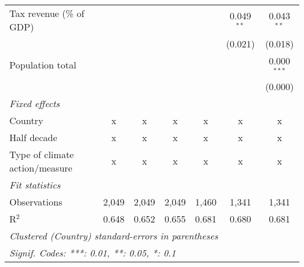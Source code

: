\begin{tabular}{lcccccc}
   Tax revenue (\% of GDP)                &         &                &                &                & 0.049$^{**}$   & 0.043$^{**}$\\   
                                          &         &                &                &                & (0.021)        & (0.018)\\   
   Population total                       &         &                &                &                &                & 0.000$^{***}$\\   
                                          &         &                &                &                &                & (0.000)\\   
   \emph{Fixed effects}\\
   Country                                & x       & x              & x              & x              & x              & x\\  
   Half decade                            & x       & x              & x              & x              & x              & x\\  
   Type of climate action/measure         & x       & x              & x              & x              & x              & x\\  
   \midrule \emph{Fit statistics}\\
   Observations                           & 2,049   & 2,049          & 2,049          & 1,460          & 1,341          & 1,341\\  
   R$^2$                                  & 0.648   & 0.652          & 0.655          & 0.681          & 0.680          & 0.681\\  
   \midrule
   \multicolumn{7}{l}{\emph{Clustered (Country) standard-errors in parentheses}}\\
   \multicolumn{7}{l}{\emph{Signif. Codes: ***: 0.01, **: 0.05, *: 0.1}}\\
\end{tabular}
\par\endgroup


